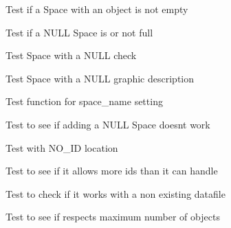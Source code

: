 \begin{DoxyRefList}
\item[\label{test__test000257}%
\hypertarget{test__test000257}{}%
Member \hyperlink{space__test_8h_aab8036bf4d58b361f8ac494ab94f6480}{test3\+\_\+space\+\_\+is\+\_\+empty} ()]Test if a Space with an object is not empty  
\item[\label{test__test000260}%
\hypertarget{test__test000260}{}%
Member \hyperlink{space__test_8h_a006533758c4f6d2d9cec39d52e70f561}{test3\+\_\+space\+\_\+is\+\_\+full} ()]Test if a N\+U\+LL Space is or not full  
\item[\label{test__test000230}%
\hypertarget{test__test000230}{}%
Member \hyperlink{space__test_8h_a71a928d80af21412a72e670f9505f2bf}{test3\+\_\+space\+\_\+set\+\_\+check} ()]Test Space with a N\+U\+LL check  
\item[\label{test__test000227}%
\hypertarget{test__test000227}{}%
Member \hyperlink{space__test_8h_a29d200c30a42700786a19f453f5a6b26}{test3\+\_\+space\+\_\+set\+\_\+graphic\+\_\+description} ()]Test Space with a N\+U\+LL graphic description  
\item[\label{test__test000216}%
\hypertarget{test__test000216}{}%
Member \hyperlink{space__test_8h_aa24a337830006e33706ab6ac1c416b47}{test3\+\_\+space\+\_\+set\+\_\+name} ()]Test function for space\+\_\+name setting  
\item[\label{test__test000050}%
\hypertarget{test__test000050}{}%
Member \hyperlink{game__test_8h_a5384fe9237e9434f5d1e80fc00380721}{test4\+\_\+game\+\_\+add\+\_\+object} ()]Test to see if adding a N\+U\+LL Space doesn\textquotesingle{}t work  
\item[\label{test__test000045}%
\hypertarget{test__test000045}{}%
Member \hyperlink{game__test_8h_a5f21b1b7e92b85990d3e5f4ea82ba68e}{test4\+\_\+game\+\_\+add\+\_\+player} ()]Test with N\+O\+\_\+\+ID location  
\item[\label{test__test000041}%
\hypertarget{test__test000041}{}%
Member \hyperlink{game__test_8h_a1cd2a0a0c093a5144ed375760b7dc10f}{test4\+\_\+game\+\_\+add\+\_\+space} ()]Test to see if it allows more ids than it can handle  
\item[\label{test__test000031}%
\hypertarget{test__test000031}{}%
Member \hyperlink{game__test_8h_aa6087c9d179d02f0fb7a5f1d0a13cffe}{test4\+\_\+game\+\_\+create\+\_\+from\+\_\+file} ()]Test to check if it works with a non existing datafile  
\item[\label{test__test000064}%
\hypertarget{test__test000064}{}%
Member \hyperlink{game__test_8h_a4186bf1b76d8e7ed80fb05b0947f9a1e}{test4\+\_\+game\+\_\+get\+\_\+objects\+\_\+number} ()]Test to see if respects maximum number of objects  

\end{DoxyRefList}
